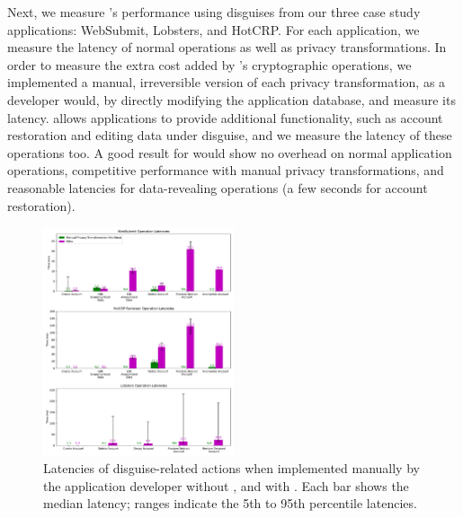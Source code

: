 %
Next, we measure \sys's performance using disguises from our three case study
applications: WebSubmit, Lobsters, and HotCRP.
%
For each application, we measure the latency of normal operations as well as
privacy transformations.
%
In order to measure the extra cost added by \sys's cryptographic operations,
we implemented a manual, irreversible version of each privacy transformation,
as a developer would, by directly modifying the application database, and
measure its latency.
%
\sys allows applications to provide additional functionality, such as account
restoration and editing data under disguise, and we measure the latency of these
operations too.
%
A good result for \sys would show no overhead on normal application operations,
competitive performance with manual privacy transformations, and reasonable
latencies for data-revealing operations (\eg a few seconds for account
restoration).
%

\begin{figure}[t]
    \centering
    \includegraphics[width=0.5\textwidth]{figs/client_op_stats}
    \caption{Latencies of disguise-related actions when implemented manually by the
    application developer without \sys, and with \sys.
    Each bar shows the median latency; ranges indicate the 5th to 95th
    percentile latencies.}
    \label{fig:client_opstats}
\end{figure}

